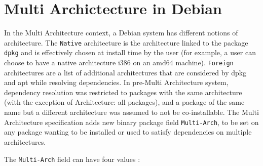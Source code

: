 \section{Multi Archictecture in Debian}

In the Multi Architecture context, a Debian system has different notions of
architecture. The \texttt{Native} architecture is the architecture linked to
the package \texttt{dpkg} and is effectively chosen at install time by the user
(for example, a user can choose to have a native architecture i386 on an amd64
machine). \texttt{Foreign} architectures are a list of additional
architectures that are considered by dpkg and apt while resolving dependencies. 
In pre-Multi Architecture system, dependency resolution was restricted to
packages with the same architecture (with the exception of Architecture: all
packages), and a package of the same name but a different architecture was
assumed to not be co-installable. The Multi Architecture specification adds new
binary package field \texttt{Multi-Arch}, to be set on any package wanting to
be installed or used to satisfy dependencies on multiple architectures.

The \texttt{Multi-Arch} field can have four values :

